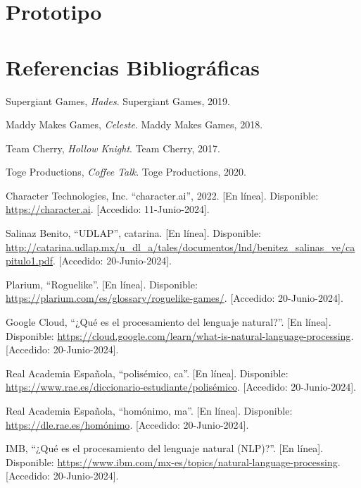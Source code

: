 \documentclass[12pt,twoside]{article}
\begin{document}
	\clearpage
	
	\section{Prototipo}

	\clearpage
	
	\section{Referencias Bibliográficas}
	
	\begin{thebibliography}{10}
	
	Supergiant Games, \textit{Hades}. Supergiant Games, 2019.
	
	Maddy Makes Games, \textit{Celeste}. Maddy Makes Games, 2018.
	
	Team Cherry, \textit{Hollow Knight}. Team Cherry, 2017.
	
	Toge Productions, \textit{Coffee Talk}. Toge Productions, 2020.
	
	Character Technologies, Inc. ``character.ai'', 2022. [En línea]. Disponible: \url{https://character.ai}. [Accedido: 11-Junio-2024].
	
	Salinaz Benito, ``UDLAP'', catarina. [En línea]. Disponible: \url{http://catarina.udlap.mx/u_dl_a/tales/documentos/lnd/benitez_salinas_ve/capitulo1.pdf}. [Accedido: 20-Junio-2024].
	
	Plarium, ``Roguelike''. [En línea]. Disponible: \url{https://plarium.com/es/glossary/roguelike-games/}. [Accedido: 20-Junio-2024].
	
	Google Cloud, ``¿Qué es el procesamiento del lenguaje natural?''. [En línea]. Disponible: \url{https://cloud.google.com/learn/what-is-natural-language-processing}. [Accedido: 20-Junio-2024].
	
	Real Academia Española, ``polisémico, ca''. [En línea]. Disponible: \url{https://www.rae.es/diccionario-estudiante/polisémico}. [Accedido: 20-Junio-2024].
	
	Real Academia Española, ``homónimo, ma''. [En línea]. Disponible: \url{https://dle.rae.es/homónimo}. [Accedido: 20-Junio-2024].
	
	IMB, ``¿Qué es el procesamiento del lenguaje natural (NLP)?''. [En línea]. Disponible: \url{https://www.ibm.com/mx-es/topics/natural-language-processing}. [Accedido: 20-Junio-2024].
	

\end{thebibliography}
\end{document}
